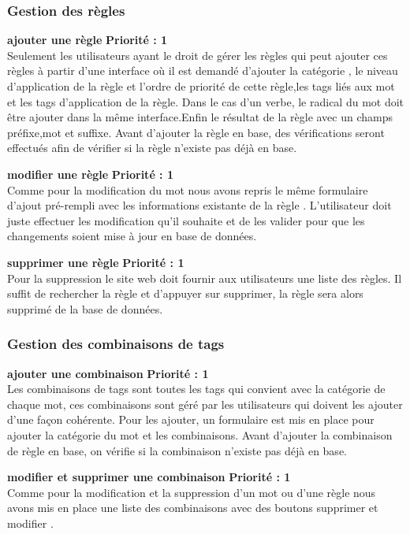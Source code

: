 \documentclass[12pt,a4paper]{article}
\begin{document}
\subsubsection{Gestion des règles }
\textbf{ajouter une règle } \textbf{Priorité : 1} \\ Seulement les utilisateurs ayant le droit de gérer les règles qui peut ajouter ces règles à partir d'une interface où il est demandé d'ajouter la catégorie , le niveau d'application de la règle et l'ordre de priorité de cette règle,les tags liés aux mot et les tags d'application de la règle. Dans le cas d'un  verbe, le radical du mot doit être ajouter dans la même interface.Enfin le résultat de la règle avec un champs préfixe,mot et suffixe.
Avant d'ajouter la règle en base, des vérifications seront effectués afin  de vérifier si la règle n'existe pas déjà en base.

\textbf{modifier une règle } \textbf{Priorité : 1} \\ Comme pour la modification du mot nous avons repris le même formulaire d'ajout pré-rempli avec les informations existante de la règle . L'utilisateur doit juste effectuer les modification qu'il souhaite et de les valider pour que les changements soient mise à jour  en base de données.


\textbf{supprimer une règle } \textbf{Priorité : 1} \\ Pour la suppression le site web doit fournir aux utilisateurs une liste des règles. Il suffit de rechercher la règle et d'appuyer sur supprimer, la règle  sera alors supprimé de la base de données.

\subsubsection{Gestion des combinaisons de tags }
\textbf{ajouter une combinaison } \textbf{Priorité : 1} \\ Les combinaisons de tags  sont  toutes les tags qui convient avec la catégorie de chaque mot, ces combinaisons sont géré par les utilisateurs qui doivent les ajouter d'une façon cohérente.
Pour les ajouter, un formulaire est mis en place pour ajouter la catégorie du mot et les combinaisons. Avant d'ajouter la combinaison de règle en base, on vérifie si la combinaison n'existe pas déjà en base.

\textbf{modifier et supprimer une combinaison } \textbf{Priorité : 1} \\ Comme pour la modification et la suppression d'un mot ou d'une règle nous avons mis en place une liste des combinaisons avec des boutons supprimer et modifier .
\end{document}
